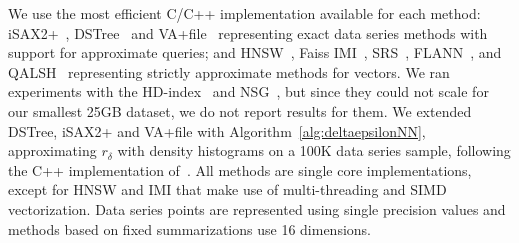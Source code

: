 {
We use the most efficient C/C++ implementation available for each method: %
iSAX2+~\cite{url/DSSeval}, DSTree~\cite{url/DSSeval} and VA+file~\cite{url/DSSeval} representing exact data series methods with support for approximate queries; and HNSW~\cite{url/hnsw}, Faiss IMI~\cite{url/faiss}, SRS~\cite{url/srs}, {\color{black} FLANN~\cite{flann}, and QALSH~\cite{qalsh} representing strictly approximate methods for vectors. We ran experiments with the HD-index~\cite{hdindex} and NSG~\cite{nsg}, but since they could not scale for our smallest 25GB dataset, we do not report results for them.}
We extended DSTree, iSAX2+ and VA+file with Algorithm~\ref{alg:deltaepsilonNN}, approximating $r_{\delta}$ with density histograms on a 100K data series sample, following the C++ implementation of~\cite{conf/icde/Ciaccia2000}. 
All methods are single core implementations, except for HNSW and IMI that make use of multi-threading and SIMD vectorization. 
Data series points are %
represented using single precision values and methods based on fixed summarizations use 16 dimensions. 

}

